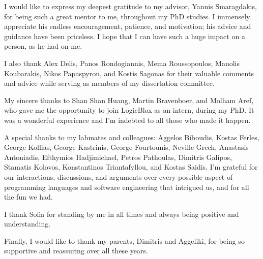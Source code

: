 I would like to express my deepest gratitude to my advisor, Yannis
Smaragdakis, for being such a great mentor to me, throughout my PhD
studies. I immensely appreciate his endless encouragement, patience,
and motivation; his advice and guidance have been priceless. I hope
that I can have such a huge impact on a person, as he had on me.

I also thank Alex Delis, Panos Rondogiannis, Mema Roussopoulos,
Manolis Koubarakis, Nikos Papaspyrou, and Kostis Sagonas for their
valuable comments and advice while serving as members of my
dissertation committee.

My sincere thanks to Shan Shan Huang, Martin Bravenboer, and Molham
Aref, who gave me the opportunity to join LogicBlox as an intern,
during my PhD. It was a wonderful experience and I'm indebted to all
those who made it happen.

A special thanks to my labmates and colleagues: Aggelos Biboudis,
Kostas Ferles, George Kollias, George Kastrinis, George Fourtounis,
Neville Grech, Anastasis Antoniadis, Efthymios Hadjimichael, Petros
Pathoulas, Dimitris Galipos, Stamatis Kolovos, Konstantinos
Triantafyllou, and Kostas Saidis.
%
I'm grateful for our interactions, discussions, and arguments over
every possible aspect of programming languages and software
engineering that intrigued us, and for all the fun we had.

I thank Sofia for standing by me in all times and always being
positive and understanding.

Finally, I would like to thank my parents, Dimitris and Aggeliki, for
being so supportive and reassuring over all these years.


